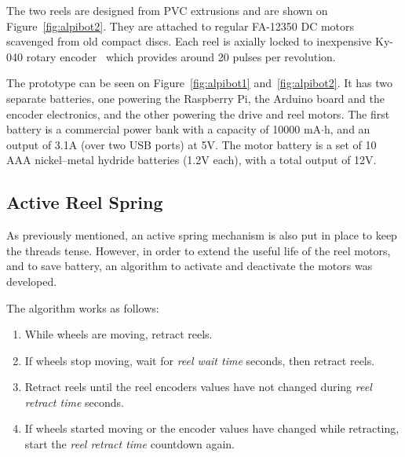 \documentclass[journal]{IEEEtran}
\begin{document}

The two reels are designed from PVC extrusions and are shown on Figure~\ref{fig:alpibot2}.  They are attached to regular FA-12350 DC motors scavenged from old compact discs.  Each reel is axially locked to inexpensive Ky-040 rotary encoder~\cite{SugaharaJunOnoKoji1998} which provides around 20 pulses per revolution.

The prototype can be seen on Figure~\ref{fig:alpibot1} and~\ref{fig:alpibot2}.  It has two separate batteries, one powering the Raspberry Pi, the Arduino board and the encoder electronics, and the other powering the drive and reel motors. The first battery is a commercial power bank with a capacity of 10000 mA$\cdot$h, and an output of 3.1A (over two USB ports) at 5V. The motor battery is a set of 10 AAA nickel–metal hydride batteries (1.2V each), with a total output of 12V.  

\subsection{Active Reel Spring}

As previously mentioned, an active spring mechanism is also put in place to keep the threads tense.  However, in order to extend the useful life of the reel motors, and to save battery, an algorithm to  activate and deactivate the motors was developed. 

The algorithm works as follows: 

\begin{enumerate}
    \item While wheels are moving, retract reels.
    \item If wheels stop moving, wait for \textit{reel wait time} seconds, then retract reels. 
    \item Retract reels until the reel encoders values have not changed during \textit{reel retract time} seconds.
    \item If wheels started moving or the encoder values have changed while retracting, start the \textit{reel retract time} countdown again.
\end{enumerate}{}
\end{document}
